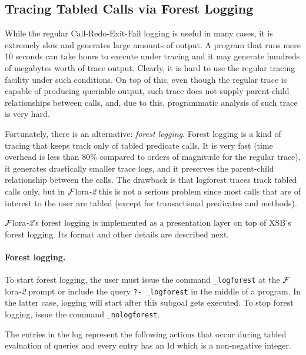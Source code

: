\documentclass[11pt]{article}
\newcommand{\FLORA}{{\mbox{\sc ${\cal F}${lora}\rm\emph{-2}}}\xspace}
\begin{document}
\subsection{Tracing Tabled Calls via Forest Logging}\label{sec-logforest}

While the regular Call-Redo-Exit-Fail logging is useful in many cases, it
is extremely slow and generates large amounts of output. A program that
runs mere 10 seconds can take hours to execute under tracing and it may
generate hundreds of megabytes worth of trace output. Clearly, it is hard
to use the regular tracing facility under such conditions.
On top of this, even though the regular trace is capable of producing
queriable output, such trace does not supply parent-child 
relationships between calls, and, due to this, programmatic analysis of
such trace is very hard.

Fortunately, there is an alternative: \emph{forest logging}.
Forest logging is a kind of tracing that keeps track only of tabled
predicate calls. It is very fast (time overhead is less than 80\% compared
to orders of magnitude for the regular trace), it generates
drastically smaller trace logs, and it preserves the parent-child
relationship between the calls. The drawback is that logforest
traces track tabled calls
only, but in \FLORA this is not a serious problem since most calls that
are of interest to the user are
tabled (except for transactional predicates and methods).

\FLORA's forest logging is 
implemented as a presentation layer on top of XSB's forest logging.
Its format and other details are described next.

\paragraph{Forest logging.}
To start forest logging, the user
must issue the command {\tt \_logforest} at the \FLORA
prompt or include the query {\tt ?- \_logforest} in the middle of a program. 
In the latter case, logging will start after this subgoal gets
executed. 
To stop forest logging, issue the command {\tt \_nologforest}. 

The entries in the log represent the following actions that occur during
tabled evaluation of queries and every entry has an Id which is a
non-negative integer. 
\end{document}
